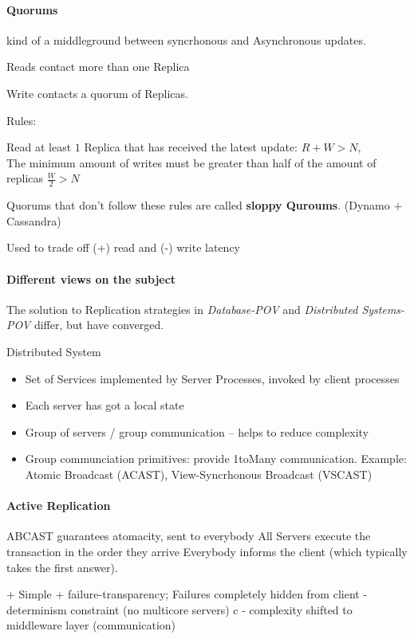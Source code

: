 \documentclass[a4paper,12pt]{article}%
\begin{document}
 
 
 
 
 
 \paragraph{Quorums}
 kind of a middleground between syncrhonous and Asynchronous updates.
 
 Reads contact more than one Replica
 
 Write contacts a quorum of Replicas.
 
 Rules:
 
 Read at least $1$ Replica that has received the latest update: $R+W > N$,\\
 The minimum amount of writes must be greater than half of the amount of replicas $\frac{W}{2} > N$
 
 Quorums that don't follow these rules are called {\bf sloppy Quroums}. (Dynamo + Cassandra)
 
 Used to trade off (+) read and (-) write latency
 
 
 
 
 \paragraph{Different views on the subject}
 The solution to Replication strategies in {\it Database-POV} and {\it Distributed Systems-POV} differ, but have converged.
 
 
 Distributed System
 \begin{itemize}
  \item Set of Services implemented by Server Processes, invoked by client processes
  \item Each server has got a local state
  \item Group of servers / group communication -- helps to reduce complexity
  \item Group communciation primitives: provide 1toMany communication. Example:  Atomic Broadcast (ACAST), View-Syncrhonous Broadcast (VSCAST) 
 \end{itemize}

 \paragraph{Active Replication}
 ABCAST guarantees atomacity, sent to everybody 
 All Servers execute the transaction in the order they arrive
 Everybody informs the client (which typically takes the first answer).
 
 + Simple
 + failure-transparency; Failures completely hidden from client
 - determinism constraint (no multicore servers) c
 - complexity shifted to middleware layer (communication)
 
\end{document}
